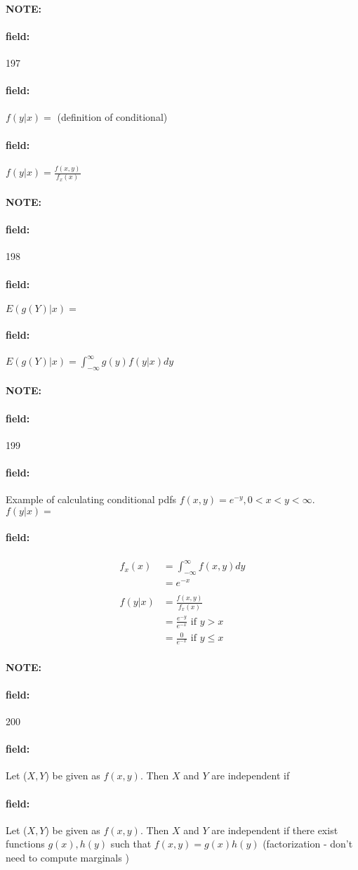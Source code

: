 \documentclass[12pt]{article}
\newenvironment{note}{\paragraph{NOTE:}}{}
\newenvironment{field}{\paragraph{field:}}{}
\begin{document}

\begin{note} \begin{field} \tiny 197 \end{field}
  \begin{field}
    $f(y|x) = $ (definition of conditional)
  \end{field}
  \begin{field}
    $f(y|x) = \frac{f(x,y)}{f_x(x)}$
  \end{field}
\end{note}

\begin{note} \begin{field} \tiny 198 \end{field}
  \begin{field}
    $E(g(Y)|x) = $
  \end{field}
  \begin{field}
    $E(g(Y)|x) = \int_{-\infty}^\infty g(y)f(y|x) dy $
  \end{field}
\end{note}

\begin{note} \begin{field} \tiny 199 \end{field}
  \begin{field}
    Example of calculating conditional pdfs
$f(x,y) = e^{-y}, 0 < x < y < \infty$. $f(y|x) = $

  \end{field}
  \begin{field}
    \begin{align*}
      f_x(x) &= \int_{-\infty}^\infty f(x,y) dy \\
      &= e^{-x}\\
      \\
      f(y|x) &= \frac{f(x,y)}{f_x(x)}\\
      &= \frac{e^{-y}}{e^{-x}} \text{ if } y > x\\
      &= \frac{0}{e^{-x}} \text{ if } y \leq x
    \end{align*}
  \end{field}
\end{note}


\begin{note} \begin{field} \tiny 200 \end{field}
  \begin{field}
    Let ($X,Y$) be given as $f(x,y)$. Then $X$ and $Y$ are independent if
  \end{field}
  \begin{field}
    Let ($X,Y$) be given as $f(x,y)$. Then $X$ and $Y$ are independent if there exist functions $g(x), h(y)$ such that $f(x,y) = g(x)h(y)$ (factorization - don't need to compute marginals )
  \end{field}
\end{note}
\end{document}
